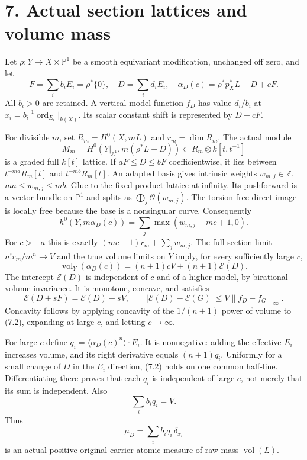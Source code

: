 \documentclass[
  10pt,
]{article}
\begin{document}
\section{7. Actual section lattices and volume
mass}\label{actual-section-lattices-and-volume-mass}

Let \(\rho:Y\to X\times\mathbb P^1\) be a smooth equivariant
modification, unchanged off zero, and let
\[F=\sum_i b_iE_i=\rho^*\{0\},\quad D=\sum_i d_iE_i,
\quad \alpha_D(c)=\rho^*p_X^*L+D+cF.\] All \(b_i>0\) are retained. A
vertical model function \(f_D\) has value \(d_i/b_i\) at
\(x_i=b_i^{-1}\operatorname{ord}_{E_i}|_{k(X)}\). Its scalar constant
shift is represented by \(D+cF\).

For divisible \(m\), set \(R_m=H^0(X,mL)\) and \(r_m=\dim R_m\). The
actual module \[M_m=H^0(Y|_{\mathbb A^1},m(\rho^*L+D))
\subset R_m\otimes k[t,t^{-1}]\] is a graded full \(k[t]\) lattice. If
\(aF\leq D\leq bF\) coefficientwise, it lies between \(t^{-ma}R_m[t]\)
and \(t^{-mb}R_m[t]\). An adapted basis gives intrinsic weights
\(w_{m,j}\in\mathbb Z\), \(ma\leq w_{m,j}\leq mb\). Glue to the fixed
product lattice at infinity. Its pushforward is a vector bundle on
\(\mathbb P^1\) and splits as \(\bigoplus_j\mathcal O(w_{m,j})\). The
torsion-free direct image is locally free because the base is a
nonsingular curve. Consequently
\[h^0(Y,m\alpha_D(c))=\sum_j\max(w_{m,j}+mc+1,0).\tag{7.1}\] For
\(c>-a\) this is exactly \((mc+1)r_m+\sum_jw_{m,j}\). The full-section
limit \(n!r_m/m^n\to V\) and the true volume limits on \(Y\) imply, for
every sufficiently large \(c\),
\[\operatorname{vol}_Y(\alpha_D(c))=(n+1)cV+(n+1)\mathscr E(D).\tag{7.2}\]
The intercept \(\mathscr E(D)\) is independent of \(c\) and of a higher
model, by birational volume invariance. It is monotone, concave, and
satisfies \[\mathscr E(D+sF)=\mathscr E(D)+sV,
\qquad |\mathscr E(D)-\mathscr E(G)|\leq V\|f_D-f_G\|_\infty.\]
Concavity follows by applying concavity of the \(1/(n+1)\) power of
volume to (7.2), expanding at large \(c\), and letting \(c\to\infty\).

For large \(c\) define \(q_i=\langle\alpha_D(c)^n\rangle\cdot E_i\). It
is nonnegative: adding the effective \(E_i\) increases volume, and its
right derivative equals \((n+1)q_i\). Uniformly for a small change of
\(D\) in the \(E_i\) direction, (7.2) holds on one common half-line.
Differentiating there proves that each \(q_i\) is independent of large
\(c\), not merely that its sum is independent. Also \[\sum_i b_iq_i=V.\]
Thus \[\mu_D=\sum_i b_iq_i\,\delta_{x_i}\tag{7.3}\] is an actual
positive original-carrier atomic measure of raw mass
\(\operatorname{vol}(L)\).
\end{document}
